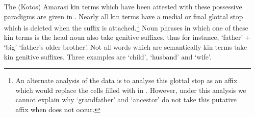 The (Kotos) Amarasi kin terms which have been attested with
these possessive paradigms are given in .
Nearly all kin terms have a medial or final glottal stop
which is deleted when the suffix  is attached.\footnote{
		An alternate analysis of the data is to analyse
		this glottal stop as an affix which would replace the cells
		filled with {\0} in . However, under
		this analysis we cannot explain why  `grandfather'
		and  `ancestor' do not take this putative 
		affix when  does not occur.}
Noun phrases in which one of these kin terms is the head
noun also take genitive suffixes, thus for instance,
 `father' +  `big' {\ra}  `father's older brother'.
Not all words which are semantically kin terms take kin genitive suffixes.
Three examples are  `child',  `husband' and  `wife'.

